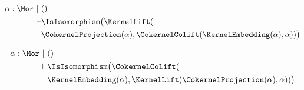 \begin{sequent}
\begin{align*}
  \alpha:\Mor~|~ &() \\
  \vdash &\IsIsomorphism\big( \KernelLift( \\
  &\CokernelProjection( \alpha ), \CokernelColift( \KernelEmbedding( \alpha ), \alpha ))\big)
\end{align*}
\end{sequent}

\begin{sequent}
\begin{align*}
  \alpha:\Mor~|~ &() \\
  \vdash &\IsIsomorphism\big( \CokernelColift( \\
  &\KernelEmbedding( \alpha ), \KernelLift( \CokernelProjection( \alpha ), \alpha ))\big)
\end{align*}
\end{sequent}